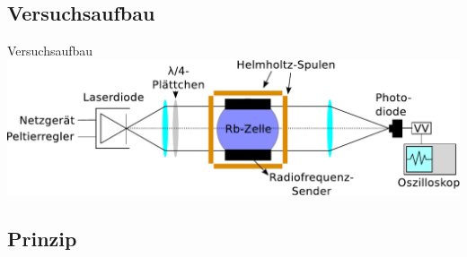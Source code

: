 \documentclass{beamer}
\begin{document}
\subsection{Versuchsaufbau}
\begin{frame}{Versuchsaufbau}
	\centering \includegraphics[width=\textwidth]{Bilder/ABDR.pdf}
\end{frame}

\subsection{Prinzip}
\end{document}
